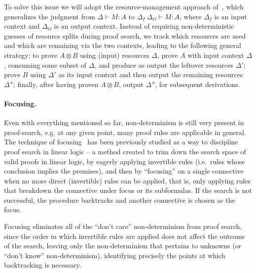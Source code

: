 \documentclass{llncs}
\newcommand{\tensor}{\otimes}
\newcommand{\mypara}[1]{\paragraph{\textbf{#1}.}}
\begin{document}
To solve this issue we will adopt the resource-management
approach
of~\cite{DBLP:journals/tcs/CervesatoHP00,DBLP:conf/lics/LiangM09},
which generalizes the judgment  from $\Delta \vdash M : A$ to
$\Delta_I \ \Delta_O \vdash M : A$, where $\Delta_I$ is an input
context and $\Delta_O$ is an output context.
Instead of requiring non-deterministic guesses of resource splits
during proof search, we track which resources are used and which are
remaining via the two contexts, leading to the following general strategy: to
prove $A\tensor B$ using (input) resources $\Delta$, prove $A$ with
input context $\Delta$,
consuming some subset of $\Delta$, and produce as output the leftover
resources $\Delta'$; prove $B$ using $\Delta'$ as its input context and then output the
remaining resources $\Delta''$; finally, after having proven
$A\tensor B$, output $\Delta''$, for subsequent derivations.


\mypara{Focusing}

Even with everything mentioned so far, non-determinism is still very
present in proof-search, e.g. at any given point, many proof
rules are applicable in general. The technique of focusing~\cite{10.1093/logcom/2.3.297,DBLP:conf/cade/ChaudhuriP05}
has been previously studied as a way to discipline proof search in
linear logic -- a method created to trim down the search space of
valid proofs in linear logic, by eagerly applying invertible rules
(i.e.~rules whose conclusion implies the premises), and then by
``focusing'' on a single connective when no more direct (invertible)
rules can be applied, that is, only applying rules that breakdown
the connective under focus or its subformulas. If the search is not
successful, the procedure backtracks and another connective is
chosen as the focus.

Focusing eliminates all of the ``don't care'' non-determinism from
proof search, since the order in which invertible rules are applied
does not affect the outcome of the search, leaving only the
non-determinism that pertains to unknowns (or ``don't know''
non-determinism), identifying precisely the points at which
backtracking is necessary.




\end{document}
